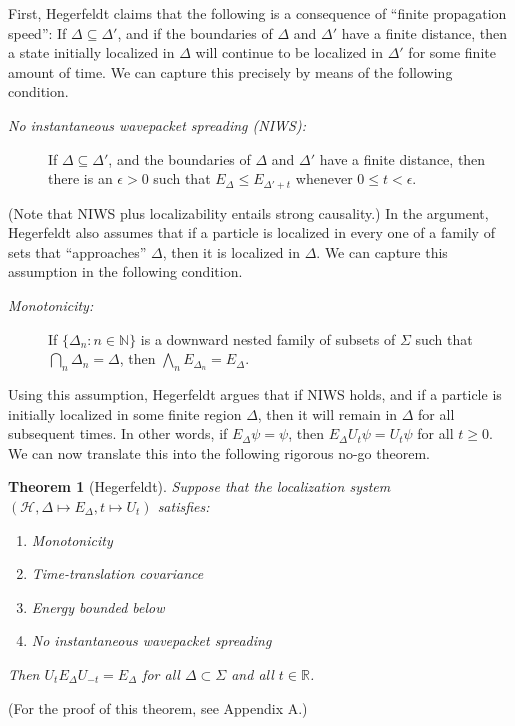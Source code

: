 \documentclass[11pt]{article}
\newtheorem*{thm*}{Theorem}
\theoremstyle{remark}
\newcommand{\hil}[1]{\mathcal{#1}}
\begin{document}
First, Hegerfeldt claims that the following is a consequence of
``finite propagation speed'': If $\Delta \subseteq \Delta '$, and if
the boundaries of $\Delta$ and $\Delta '$ have a finite distance, then
a state initially localized in $\Delta$ will continue to be localized
in $\Delta '$ for some finite amount of time.  We can capture this
precisely by means of the following condition.
\begin{description} 
\item[{\it No instantaneous wavepacket spreading (NIWS):}] If $\Delta
  \subseteq \Delta '$, and the boundaries of $\Delta$ and $\Delta '$
  have a finite distance, then there is an $\epsilon >0$ such that
  $E_{\Delta}\leq E_{\Delta '+t}$ whenever $0\leq t < \epsilon$.
\end{description} 
(Note that NIWS plus localizability entails strong causality.)  In the
argument, Hegerfeldt also assumes that if a particle is localized in
every one of a family of sets that ``approaches'' $\Delta$, then it is
localized in $\Delta$.  We can capture this assumption in the
following condition.
\begin{description}
\item[{\it Monotonicity:}] If $\{ \Delta _{n}:n \in \mathbb{N} \}$ is
  a downward nested family of subsets of $\Sigma$ such that $\bigcap
  _{n}\Delta _{n} =\Delta$, then $\bigwedge _{n}E_{\Delta
    _{n}}=E_{\Delta}$.  \end{description} Using this assumption,
Hegerfeldt argues that if NIWS holds, and if a particle is initially
localized in some finite region $\Delta$, then it will remain in
$\Delta$ for all subsequent times.  In other words, if $E_{\Delta}\psi
=\psi$, then $E_{\Delta}U_{t}\psi =U_{t}\psi$ for all $t\geq 0$.  We
can now translate this into the following rigorous no-go theorem.
\begin{thm*}[Hegerfeldt] Suppose that the localization system $(\hil{H},\Delta
  \mapsto E_{\Delta},t\mapsto U_{t})$ satisfies:
\begin{enumerate}
\item Monotonicity
\item Time-translation covariance
\item Energy bounded below
\item No instantaneous wavepacket spreading 
\end{enumerate}
Then $U_{t}E_{\Delta}U_{-t}=E_{\Delta}$ for all $\Delta \subset
\Sigma$ and all $t\in \mathbb{R}$. \label{reconstruct}
\end{thm*}
\noindent (For the proof of this theorem, see Appendix A.)  
\end{document}
